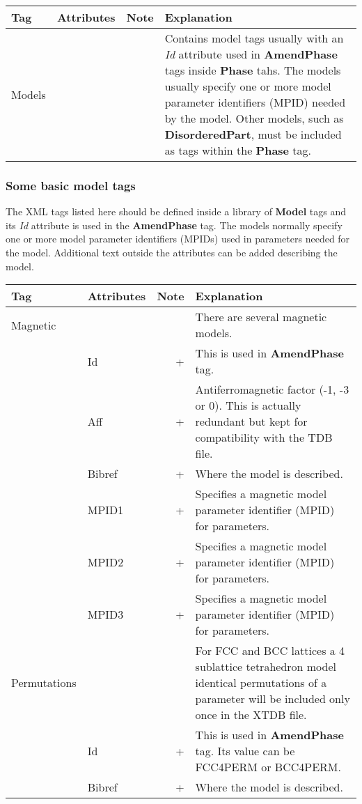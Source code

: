 \documentclass{article}
\begin{document}
\bigskip
\begin{tabular}{|p{} p{} r p{}|}\hline
  Tag & Attributes & Note & Explanation\\\hline

  Models & && Contains model tags usually with an {\em Id} attribute
  used in {\bf AmendPhase} tags inside {\bf Phase} tahs.  The models
  usually specify one or more model parameter identifiers (MPID)
  needed by the model.  Other models, such as {\bf DisorderedPart},
  must be included as tags within the {\bf Phase} tag.\\\hline
\end{tabular}


\subsubsection{Some basic model tags}

The XML tags listed here should be defined inside a library of {\bf
  Model} tags and its {\em Id} attribute is used in the {\bf
  AmendPhase} tag.  The models normally specify one or more model
parameter identifiers (MPIDs) used in parameters needed for the model.
Additional text outside the attributes can be added describing the
model.

\bigskip
\begin{tabular}{|p{} p{} r p{}|}\hline
  Tag & Attributes & Note & Explanation\\\hline

  Magnetic & && There are several magnetic models.\\
      & Id & + & This is used in {\bf AmendPhase} tag.\\
      & Aff   & + & Antiferromagnetic factor (-1, -3 or 0).  This is actually
                    redundant but kept for compatibility with the TDB file.\\
      & Bibref & + & Where the model is described.\\
      & MPID1 & + & Specifies a magnetic model parameter 
                    identifier (MPID) for parameters.\\
      & MPID2 & + & Specifies a magnetic model parameter 
                    identifier (MPID) for parameters.\\
      & MPID3 & + & Specifies a magnetic model parameter 
                    identifier (MPID) for parameters.\\\hline


 Permutations & & & For FCC and BCC lattices a 4 sublattice tetrahedron model
                    identical permutations of a parameter will be included 
                    only once in the XTDB file.\\
     & Id & + & This is used in {\bf AmendPhase} tag.  Its value can be
                  FCC4PERM or BCC4PERM.\\
     & Bibref & + & Where the model is described.\\\hline

\end{tabular}
\end{document}
